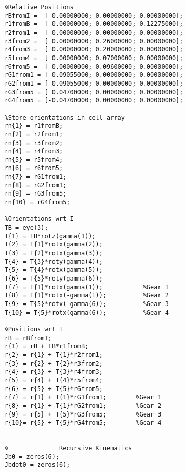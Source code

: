 \begin{lstlisting}[frame=lines,style=Matlab-editor,basicstyle = \mlttfamily, caption={H, D, and G Calculations}]
    %          Forward kinematics
    %Relative Positions
    rBfromI =  [ 0.00000000; 0.00000000; 0.00000000];
    r1fromB =  [ 0.00000000; 0.00000000; 0.12275000];
    r2from1 =  [ 0.00000000; 0.00000000; 0.00000000];
    r3from2 =  [ 0.00000000; 0.26000000; 0.00000000];
    r4from3 =  [ 0.00000000; 0.20000000; 0.00000000];
    r5from4 =  [ 0.00000000; 0.07000000; 0.00000000];
    r6from5 =  [ 0.00000000; 0.09600000; 0.00000000];
    rG1from1 = [ 0.09055000; 0.00000000; 0.00000000];
    rG2from1 = [-0.09055000; 0.00000000; 0.00000000];
    rG3from5 = [ 0.04700000; 0.00000000; 0.00000000];
    rG4from5 = [-0.04700000; 0.00000000; 0.00000000];

    %Store orientations in cell array
    rn{1} = r1fromB;
    rn{2} = r2from1;
    rn{3} = r3from2;
    rn{4} = r4from3;
    rn{5} = r5from4;
    rn{6} = r6from5;
    rn{7} = rG1from1;
    rn{8} = rG2from1;
    rn{9} = rG3from5;
    rn{10} = rG4from5;

    %Orientations wrt I
    TB = eye(3);
    T{1} = TB*rotz(gamma(1));
    T{2} = T{1}*rotx(gamma(2));
    T{3} = T{2}*rotx(gamma(3));
    T{4} = T{3}*roty(gamma(4));
    T{5} = T{4}*rotx(gamma(5));
    T{6} = T{5}*roty(gamma(6));
    T{7} = T{1}*rotx(gamma(1));           %Gear 1
    T{8} = T{1}*rotx(-gamma(1));          %Gear 2
    T{9} = T{5}*rotx(-gamma(6));          %Gear 3
    T{10} = T{5}*rotx(gamma(6));          %Gear 4

    %Positions wrt I
    rB = rBfromI;
    r{1} = rB + TB*r1fromB;
    r{2} = r{1} + T{1}*r2from1;
    r{3} = r{2} + T{2}*r3from2;
    r{4} = r{3} + T{3}*r4from3;
    r{5} = r{4} + T{4}*r5from4;
    r{6} = r{5} + T{5}*r6from5;
    r{7} = r{1} + T{1}*rG1from1;        %Gear 1
    r{8} = r{1} + T{1}*rG2from1;        %Gear 2
    r{9} = r{5} + T{5}*rG3from5;        %Gear 3
    r{10}= r{5} + T{5}*rG4from5;        %Gear 4


    %              Recursive Kinematics
    Jb0 = zeros(6);
    Jbdot0 = zeros(6);


\end{lstlisting}
